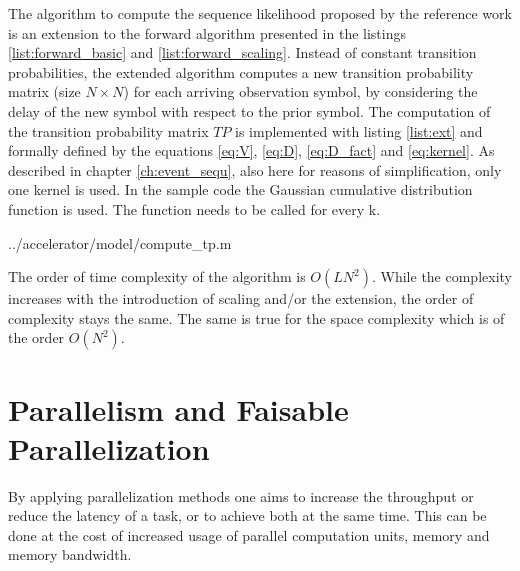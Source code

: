 \documentclass[mscthesis]{usiinfthesis}
\begin{document}
The algorithm to compute the sequence likelihood proposed by the reference work
is an extension to the forward algorithm presented in the listings
\ref{list:forward_basic} and \ref{list:forward_scaling}. Instead of constant
transition probabilities, the extended algorithm computes a new transition
probability matrix (size $ N \times N$) for each arriving observation symbol,
by considering the delay of the new symbol with respect to the prior symbol.
The computation of the transition probability matrix $ TP $ is implemented with
listing \ref{list:ext} and formally defined by the equations \ref{eq:V},
\ref{eq:D}, \ref{eq:D_fact} and \ref{eq:kernel}. As described in chapter
\ref{ch:event_sequ}, also here for reasons of simplification, only one kernel
is used. In the sample code the Gaussian cumulative distribution function is
used. The function needs to be called for every k.


    {../accelerator/model/compute_tp.m}

The order of time complexity of the algorithm is $O(LN^2)$. While the
complexity increases with the introduction of scaling and/or the extension, the
order of complexity stays the same. The same is true for the space complexity
which is of the order $O(N^2)$.

\section{Parallelism and Faisable Parallelization}
\label{ch:analysis_parallel}

By applying parallelization methods one aims to increase the throughput or
reduce the latency of a task, or to achieve both at the same time. This can be
done at the cost of increased usage of parallel computation units, memory and
memory bandwidth.
\end{document}
